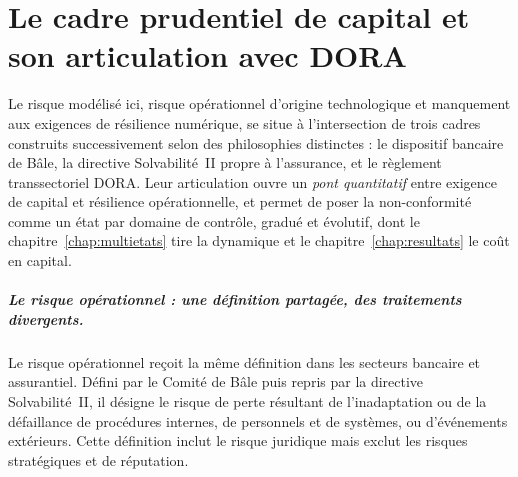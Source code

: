 \chapter{Le cadre prudentiel de capital et son articulation avec DORA}
\label{chap:reglementaire}



Le risque modélisé ici, risque opérationnel d'origine technologique et manquement aux
exigences de résilience numérique, se situe à l'intersection de trois cadres construits
successivement selon des philosophies distinctes : le dispositif bancaire de Bâle, la directive
Solvabilité~II propre à l'assurance, et le règlement transsectoriel DORA. Leur articulation
ouvre un \emph{pont quantitatif} entre exigence de capital et résilience opérationnelle, et
permet de poser la non-conformité comme un état par domaine de contrôle, gradué et évolutif,
dont le chapitre~\ref{chap:multietats} tire la dynamique et le chapitre~\ref{chap:resultats}
le coût en capital.



\paragraph{Le risque opérationnel : une définition partagée, des traitements divergents.}
Le risque opérationnel reçoit la même définition dans les secteurs bancaire et
assurantiel. Défini par le Comité de Bâle puis repris par la directive Solvabilité~II,
il désigne le risque de perte résultant de l'inadaptation ou de la défaillance de
procédures internes, de personnels et de systèmes, ou d'événements extérieurs. Cette
définition inclut le risque juridique mais exclut les risques stratégiques et de
réputation.

